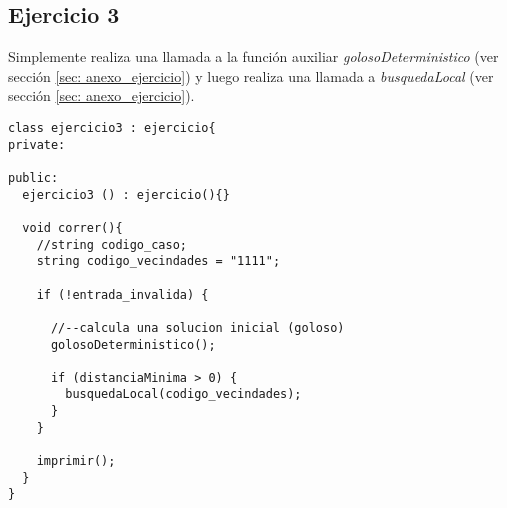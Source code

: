 \subsection{Ejercicio 3}
\label{sec: anexo_ejercicio3}
\par Simplemente realiza una llamada a la función auxiliar \textit{golosoDeterministico} (ver sección \ref{sec: anexo_ejercicio}) y luego realiza una llamada a \textit{busquedaLocal} (ver sección \ref{sec: anexo_ejercicio}).
\begin{lstlisting}
class ejercicio3 : ejercicio{
private:

public:
  ejercicio3 () : ejercicio(){}

  void correr(){
    //string codigo_caso;
    string codigo_vecindades = "1111";

    if (!entrada_invalida) {

      //--calcula una solucion inicial (goloso)
      golosoDeterministico();

      if (distanciaMinima > 0) {
        busquedaLocal(codigo_vecindades);
      }
    }

    imprimir();
  }
}
\end{lstlisting}

\newpage

